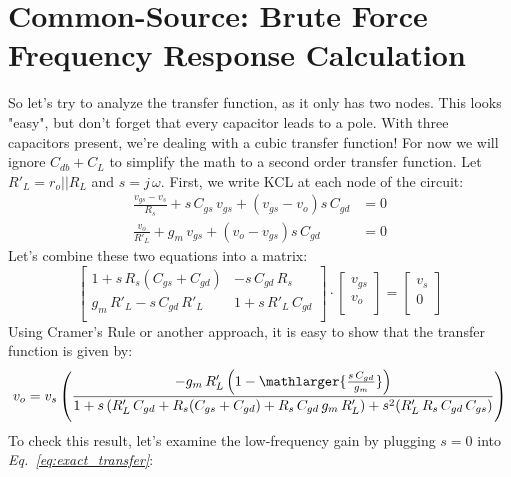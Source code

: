 \section{Common-Source:  Brute Force Frequency Response Calculation}
So let's try to analyze the transfer function, as it only has two nodes.  This looks "easy", but don't forget that every capacitor leads to a pole.  With three capacitors present, we're dealing with a cubic transfer function! For now we will ignore $C_{db}+C_L$ to simplify the math to a second order transfer function.  Let $R'_L = r_o || R_L$ and $s = j\,\omega$.  First, we write KCL at each node of the circuit:
    \begin{align}
        \frac{v_{gs} - v_s}{R_s} + s\,C_{gs}\,v_{gs} + (v_{gs} - v_o)s\,C_{gd} &= 0\\[0.25cm]
        \frac{v_o}{R'_L} + g_m\,v_{gs} + (v_o - v_{gs}) s\,C_{gd} &= 0 
    \end{align}
Let's combine these two equations into a matrix:
    \begin{equation}
        \left[\begin{matrix}
            1 + s\,R_s (C_{gs} + C_{gd}) & -s\,C_{gd}\,R_s\\[0.35cm]
            g_m\,R'_L - s\,C_{gd}\,R'_L & 1 + s\,R'_L\,C_{gd}\\
        \end{matrix}\right]
        \cdot
        \left[\begin{matrix}
            v_{gs}\\[0.35cm]
            v_o\\
        \end{matrix}\right] 	
        =
        \left[\begin{matrix}
            v_s\\[0.35cm]
            0\\
        \end{matrix}\right] 
    \end{equation}
Using Cramer's Rule or another approach, it is easy to show that the transfer function is given by:
    \begin{equation}
        v_o = v_s\left(\frac{-g_m\,R'_L\left(1 - \mathlarger{\frac{s\,C_{gd}}{g_m}}\right)}
                    {1 + s\left(R'_L\,C_{gd} + R_s(C_{gs} + C_{gd}) + R_s\,C_{gd}\,g_m\,R'_L \right) 
                        + s^2(R'_L\,R_s\,C_{gd}\,C_{gs})}\right)
        \label{eq:exact_transfer}
    \end{equation}
To check this result, let's examine the low-frequency gain by plugging $s = 0$ into \emph{Eq.~\ref{eq:exact_transfer}}:
